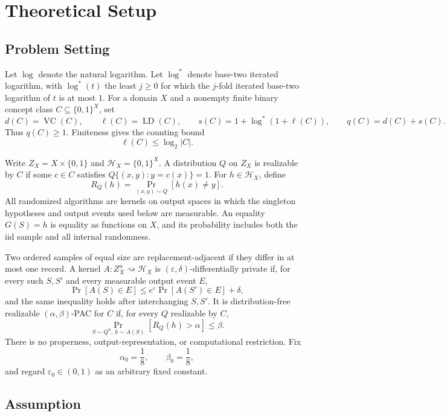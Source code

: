 \section{Theoretical Setup}\label{sec:setup}

\subsection{Problem Setting}

Let \(\log\) denote the natural logarithm.  Let \(\log^*\) denote
base-two iterated logarithm, with \(\log^*(t)\) the least
\(j\geq0\) for which the \(j\)-fold iterated base-two logarithm of
\(t\) is at most \(1\).  For a domain \(X\) and a nonempty finite
binary concept class \(C\subseteq\{0,1\}^X\), set
\[
d(C)=\operatorname{VC}(C),\qquad
\ell(C)=\operatorname{LD}(C),\qquad
s(C)=1+\log^*(1+\ell(C)),\qquad
q(C)=d(C)+s(C).
\]
Thus \(q(C)\geq1\).  Finiteness gives the counting bound
\[
\ell(C)\leq\log_2|C|.
\]

Write \(Z_X=X\times\{0,1\}\) and
\(\mathcal H_X=\{0,1\}^X\).  A distribution \(Q\) on \(Z_X\) is
realizable by \(C\) if some \(c\in C\) satisfies
\(Q\{(x,y):y=c(x)\}=1\).  For \(h\in\mathcal H_X\), define
\[
R_Q(h)=\Pr_{(x,y)\sim Q}[h(x)\neq y].
\]
All randomized algorithms are kernels on output spaces in which the
singleton hypotheses and output events used below are measurable.
An equality \(G(S)=h\) is equality as functions on \(X\), and its
probability includes both the iid sample and all internal randomness.

Two ordered samples of equal size are replacement-adjacent if they
differ in at most one record.  A kernel
\(A:Z_X^n\rightsquigarrow\mathcal H_X\) is
\((\varepsilon,\delta)\)-differentially private if, for every such
\(S,S'\) and every measurable output event \(E\),
\[
\Pr[A(S)\in E]
\leq e^\varepsilon\Pr[A(S')\in E]+\delta,
\]
and the same inequality holds after interchanging \(S,S'\).  It is
distribution-free realizable \((\alpha,\beta)\)-PAC for \(C\) if,
for every \(Q\) realizable by \(C\),
\[
\Pr_{S\sim Q^n,\,h\sim A(S)}[R_Q(h)>\alpha]\leq\beta.
\]
There is no properness, output-representation, or computational
restriction.  Fix
\[
\alpha_0=\frac18,\qquad \beta_0=\frac18,
\]
and regard \(\varepsilon_0\in(0,1)\) as an arbitrary fixed constant.

\subsection{Assumption}

